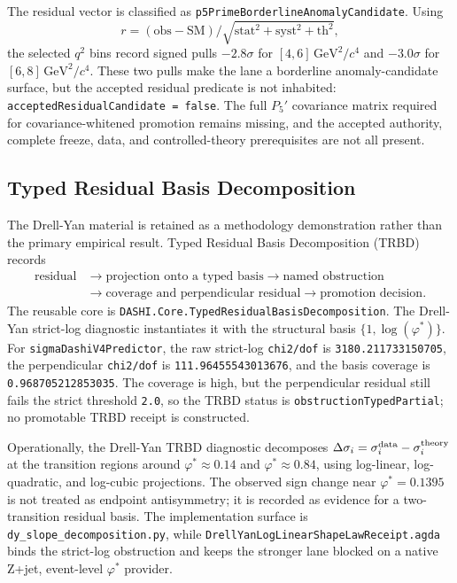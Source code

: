 \documentclass[11pt]{article}
\theoremstyle{definition}
\theoremstyle{plain}
\theoremstyle{remark}
\begin{document}
The residual vector is classified as
\texttt{p5PrimeBorderlineAnomalyCandidate}. Using
\[
r=(\mathrm{obs}-\mathrm{SM})/
\sqrt{\mathrm{stat}^2+\mathrm{syst}^2+\mathrm{th}^2},
\]
the selected \(q^2\) bins record signed pulls
\(-2.8\sigma\) for \([4,6]\,\mathrm{GeV}^2/c^4\) and
\(-3.0\sigma\) for \([6,8]\,\mathrm{GeV}^2/c^4\). These two pulls make the lane
a borderline anomaly-candidate surface, but the accepted residual predicate is
not inhabited:
\texttt{acceptedResidualCandidate = false}. The full \(P_5'\) covariance
matrix required for covariance-whitened promotion remains missing, and the
accepted authority, complete freeze, data, and controlled-theory prerequisites
are not all present.

\subsection*{Typed Residual Basis Decomposition}

The Drell-Yan material is retained as a methodology demonstration rather than
the primary empirical result. Typed Residual Basis Decomposition (TRBD)
records
\[
\begin{aligned}
\text{residual}
&\longrightarrow
\text{projection onto a typed basis}
\longrightarrow
\text{named obstruction}
\\
&\longrightarrow
\text{coverage and perpendicular residual}
\longrightarrow
\text{promotion decision}.
\end{aligned}
\]
The reusable core is \texttt{DASHI.Core.TypedResidualBasisDecomposition}. The
Drell-Yan strict-log diagnostic instantiates it with the structural basis
\(\{1,\log(\varphi^*)\}\). For \texttt{sigmaDashiV4Predictor}, the raw
strict-log \texttt{chi2/dof} is \texttt{3180.211733150705}, the perpendicular
\texttt{chi2/dof} is \texttt{111.96455543013676}, and the basis coverage is
\texttt{0.968705212853035}. The coverage is high, but the perpendicular
residual still fails the strict threshold \texttt{2.0}, so the TRBD status is
\texttt{obstructionTypedPartial}; no promotable TRBD receipt is constructed.

Operationally, the Drell-Yan TRBD diagnostic decomposes
\(\Delta\sigma_i=\sigma_i^{\rm data}-\sigma_i^{\rm theory}\) at the transition
regions around \(\varphi^*\approx0.14\) and \(\varphi^*\approx0.84\), using
log-linear, log-quadratic, and log-cubic projections. The observed sign change
near \(\varphi^*=0.1395\) is not treated as endpoint antisymmetry; it is
recorded as evidence for a two-transition residual basis. The implementation
surface is \texttt{dy\_slope\_decomposition.py}, while
\texttt{DrellYanLogLinearShapeLawReceipt.agda} binds the strict-log
obstruction and keeps the stronger lane blocked on a native Z+jet,
event-level \(\varphi^*\) provider.
\end{document}

